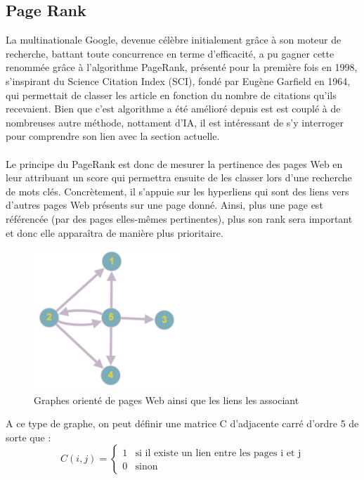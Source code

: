       \subsection{Page Rank}
        La multinationale Google, devenue célèbre initialement grâce à son moteur de recherche, battant toute concurrence en terme d'efficacité, a pu gagner cette renommée grâce à l'algorithme  PageRank, présenté pour la première fois en 1998, s'inspirant du Science Citation Index (SCI), fondé par Eugène Garfield en 1964, qui permettait de classer les article en fonction du nombre de citations qu'ils recevaient. Bien que c'est algorithme a été amélioré depuis est est couplé à de nombreuses autre méthode, nottament d'IA, il est intéressant de s'y interroger pour comprendre son lien avec la section actuelle.\\\\
        Le principe du PageRank est donc de mesurer la pertinence des pages Web en leur attribuant un score qui permettra ensuite de les classer lors d'une recherche de mots clés. Concrètement, il s'appuie sur les hyperliens qui sont des liens vers d'autres pages Web présents sur une page donné. Ainsi, plus une page est référencée (par des pages elles-mêmes pertinentes), plus son rank sera important et donc elle apparaîtra de manière plus prioritaire.
        \begin{figure}[H]
              \centering
                \includegraphics[width=0.5\textwidth]{images/graphe1.jpg}
              \caption{Graphes orienté de pages Web ainsi que les liens les associant}
              \label{fig:gr1}
            \end{figure}
        A ce type de graphe, on peut définir une matrice C d'adjacente carré d'ordre 5 de sorte que :
        $$
        C(i,j) = \begin{cases}
1&\text{si il existe un lien entre les pages i et j}\\
0&\text{sinon}
\end{cases}
        $$
